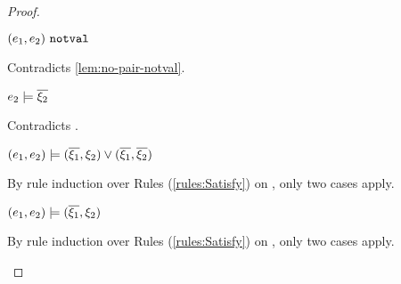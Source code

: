 \begin{proof}
\begin{byCases}
\begin{byCases}
\begin{byCases}
\begin{byCases}
                \begin{byCases}
                \item[\text{(\ref{rule:CSNotValPair})}]
                    \begin{pfsteps*}
                    \item $(e_1 , e_2) ~\mathtt{notval}$ 
                    \end{pfsteps*}
                    Contradicts \autoref{lem:no-pair-notval}.
                \item[\text{(\ref{rule:CSPair})}]
                    \begin{pfsteps*}
                    \item $e_2 \models \overline{\xi_2}$ 
                    \end{pfsteps*}
                    Contradicts .
                \end{byCases}
            \item[\text{(\ref{rule:CSOr2})}]
                \begin{pfsteps*}
                \item $(e_1 , e_2) \models (\overline{\xi_1} , \xi_2) \vee (\overline{\xi_1} , \overline{\xi_2})$  
                \end{pfsteps*}
                By rule induction over Rules (\ref{rules:Satisfy}) on , only two cases apply.
                \begin{byCases}
                \item[\text{(\ref{rule:CSOr1})}]
                    \begin{pfsteps*}
                    \item $(e_1 , e_2) \models (\overline{\xi_1} , \xi_2)$  
                    \end{pfsteps*}
                    By rule induction over Rules (\ref{rules:Satisfy}) on , only two cases apply.
                    \begin{byCases}
                    \item[\text{(\ref{rule:CSNotValPair})}]
                        \begin{pfsteps*}

\end{pfsteps*}
\end{byCases}
\end{byCases}
\end{byCases}
\end{byCases}
\end{byCases}
\end{byCases}
\end{proof}
